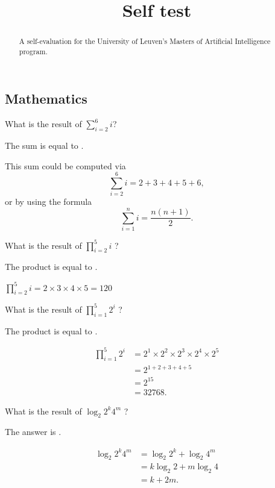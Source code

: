 \documentclass{ximera}
\title{Self test}
\begin{document}
\begin{abstract}
A self-evaluation for the University of Leuven's Masters of Artificial
Intelligence program.
\end{abstract}
\maketitle

\subsection*{Mathematics}

\begin{question}
What is the result of $\sum_{i=2}^6 i$?
\begin{solution}
The sum is equal to .
\end{solution}
This sum could be computed via
\[
\sum_{i=2}^6 i = 2 + 3 + 4 + 5 + 6,
\]
or by using the formula
\[
\sum_{i=1}^n i = \frac{n(n+1)}{2}.
\]
\end{question}

\begin{question}
What is  the result of $\prod_{i=2}^{5} i$ ? 
\begin{solution}
The product is equal to .
\end{solution}
$\prod_{i=2}^5 i = 2 \times 3 \times 4 \times 5 = 120$
\end{question}

\begin{question}
What is  the result of  $\prod_{i=1}^5 2^i$  ? 
\begin{solution}
The product is equal to .
\end{solution}
\begin{align*}
\prod_{i=1}^5 2^i &= 2^1 \times 2^2 \times 2^3 \times 2^4 \times 2^5 \\
&= 2^{1 + 2 + 3 + 4 + 5} \\
&= 2^{15} \\
&= 32768. 
\end{align*}
\end{question}

\begin{question}
What is  the result of  $\log_2 2^k 4^m$  ? 
\begin{solution}
The answer is .
\end{solution}
\begin{align*}
\log_2{2^k 4^m} &= \log_2{2^k} + \log_2{4^m} \\
&= k \log_2{2} + m \log_2{4} \\
&= k + 2m.
\end{align*}
\end{question}
\end{document}

